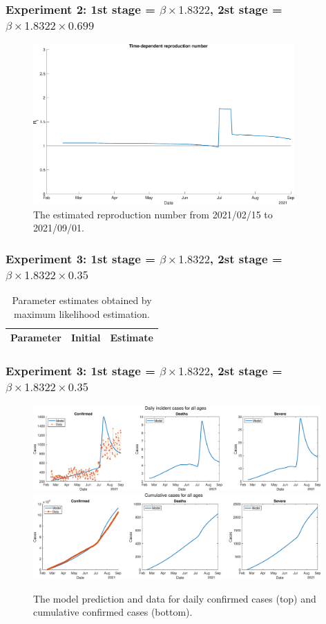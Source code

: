 \documentclass[aspectratio=169, 9pt, xcolor=dvipsnames]{beamer}
\begin{document}
	\begin{frame}\frametitle{Experiment 2: 1st stage = $\beta \times 1.8322$, 2st stage = $\beta \times 1.8322 \times 0.699$}
	    \begin{figure}
	    	\centering
	    	\includegraphics[width=10cm]{../results/estimate_sd_1st_1_2nd_2/rep_num.eps}
	    	\caption{The estimated reproduction number from 2021/02/15 to 2021/09/01.}
	    \end{figure}
	\end{frame}

	\begin{frame}\frametitle{Experiment 3: 1st stage = $\beta \times 1.8322$, 2st stage = $\beta \times 1.8322 \times 0.35$}
	    \begin{table}
	    	\begin{tabular}{crr}
	    		\toprule
	    		\textbf{Parameter} & \textbf{Initial} & \textbf{Estimate} \\
	    		\midrule
	    		
	    		\bottomrule
	    	\end{tabular}
	    	\caption{Parameter estimates obtained by maximum likelihood estimation.}
	    \end{table}
	\end{frame}

	\begin{frame}\frametitle{Experiment 3: 1st stage = $\beta \times 1.8322$, 2st stage = $\beta \times 1.8322 \times 0.35$}
	    \begin{figure}
	    	\centering
	    	\includegraphics[width=11cm]{../results/estimate_sd_1st_1_2nd_3/daily_all_age.eps}
	    	\includegraphics[width=11cm]{../results/estimate_sd_1st_1_2nd_3/cumul_all_age.eps}
	    	\caption{The model prediction and data for daily confirmed cases (top) and cumulative confirmed cases (bottom).}
	    \end{figure}
	\end{frame}
\end{document}
